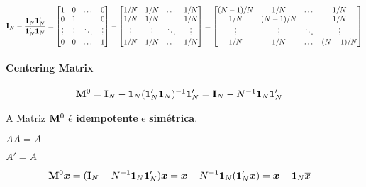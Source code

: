 \documentclass[11pt, oneside, a4paper, article]{article}
\numberwithin{equation}{section}
\begin{document}
\begin{description}
\vspace{-1 em}
\begin{align*}
	\mathbf{I}_{N} - \frac{\boldsymbol{1}_{N} \boldsymbol{1}_{N}'}{\boldsymbol{1}_{N}' \boldsymbol{1}_{N}} 
	=
	\begin{bmatrix}
		1      & 0 &\dots  & 0	 \\
		0      & 1 &\dots  & 0	 \\
		\vdots & \vdots & \ddots & \vdots\\
		0      & 0 & \dots  & 1	
	\end{bmatrix}
	-
	\begin{bmatrix}
		1/N    & 1/N    & \dots  & 1/N	 \\
		1/N    & 1/N    & \dots  & 1/N	 \\
		\vdots & \vdots & \ddots & \vdots \\
		1/N    & 1/N    & \dots  & 1/N	
	\end{bmatrix}
	=
	\begin{bmatrix}
		(N-1)/N & 1/N     & \dots  & 1/N    \\
		1/N     & (N-1)/N & \dots  & 1/N    \\
		\vdots  & \vdots  & \ddots & \vdots \\
		1/N     & 1/N     & \dots  & (N-1)/N	
	\end{bmatrix}
\end{align*}

\paragraph{Centering Matrix} \cite[p. 978, A.28]{greene-7ed}

\vspace{-1 em}
\begin{align*}
	\mathbf{M}^{0} &= 
	\mathbf{I}_{N} - \boldsymbol{1}_{N} ( \boldsymbol{1}_{N}' \boldsymbol{1}_{N} )^{-1} \boldsymbol{1}_{N}'
	= 
	\mathbf{I}_{N} - N^{-1} \boldsymbol{1}_{N} \boldsymbol{1}_{N}' 
\end{align*}

A Matriz $\mathbf{M}^{0}$ é \textbf{idempotente} e \textbf{simétrica}.

\begin{description}\itemsep0pt
	\item [Idempotência:] $AA = A$
	\item [Simetria:] $A'=A$
\end{description}

\vspace{-1 em}
\begin{align*}
	\mathbf{M}^{0} \boldsymbol{x} &= 
	( \mathbf{I}_{N} - N^{-1} \boldsymbol{1}_{N} \boldsymbol{1}_{N}' ) \boldsymbol{x} 
	= 
	\boldsymbol{x} - N^{-1} \boldsymbol{1}_{N} (\boldsymbol{1}_{N}' \boldsymbol{x}) 
	= 
	\boldsymbol{x} - \boldsymbol{1}_{N} \overline{x}
\end{align*}


\end{description}
\end{document}
